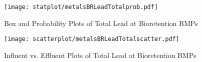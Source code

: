         \begin{figure}[hb]   %
            \centering
            \texttt{[image: statplot/metalsBRLeadTotalprob.pdf]}
            \caption{Box and Probability Plots of Total Lead at Bioretention BMPs}
        \end{figure}         %
        
        
        \begin{figure}[hb]   %
            \centering
            \texttt{[image: scatterplot/metalsBRLeadTotalscatter.pdf]}
            \caption{Influent vs. Effluent Plots of Total Lead at Bioretention BMPs}
        \end{figure}         %
        \clearpage
        
